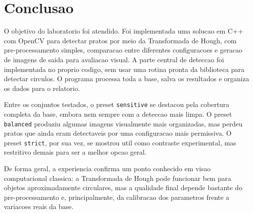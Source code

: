 \documentclass[12pt,a4paper]{article}
\begin{document}
\section{Conclusao}

O objetivo do laboratorio foi atendido. Foi implementada uma solucao em C++ com OpenCV para detectar pratos por meio da Transformada de Hough, com pre-processamento simples, comparacao entre diferentes configuracoes e geracao de imagens de saida para avaliacao visual. A parte central de deteccao foi implementada no proprio codigo, sem usar uma rotina pronta da biblioteca para detectar circulos. O programa processa toda a base, salva os resultados e organiza os dados para o relatorio.

Entre os conjuntos testados, o preset \texttt{sensitive} se destacou pela cobertura completa da base, embora nem sempre com a deteccao mais limpa. O preset \texttt{balanced} produziu algumas imagens visualmente mais organizadas, mas perdeu pratos que ainda eram detectaveis por uma configuracao mais permissiva. O preset \texttt{strict}, por sua vez, se mostrou util como contraste experimental, mas restritivo demais para ser a melhor opcao geral.

De forma geral, a experiencia confirma um ponto conhecido em visao computacional classica: a Transformada de Hough pode funcionar bem para objetos aproximadamente circulares, mas a qualidade final depende bastante do pre-processamento e, principalmente, da calibracao dos parametros frente a variacoes reais da base.
\end{document}
